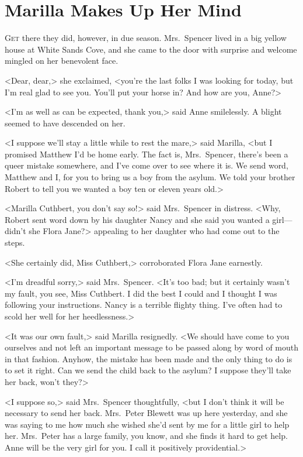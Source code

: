 \chapter{Marilla Makes Up Her Mind}

\lettrine[]{G}{et} there they did, however, in due season. Mrs.~Spencer lived in a big yellow house at White Sands Cove, and she came to the door with surprise and welcome mingled on her benevolent face.

\zz
<Dear, dear,> she exclaimed, <you're the last folks I was looking for today, but I'm real glad to see you. You'll put your horse in? And how are you, Anne?>

<I'm as well as can be expected, thank you,> said Anne smilelessly. A blight seemed to have descended on her.

<I suppose we'll stay a little while to rest the mare,> said Marilla, <but I promised Matthew I'd be home early. The fact is, Mrs.~Spencer, there's been a queer mistake somewhere, and I've come over to see where it is. We send word, Matthew and I, for you to bring us a boy from the asylum. We told your brother Robert to tell you we wanted a boy ten or eleven years old.>

<Marilla Cuthbert, you don't say so!> said Mrs.~Spencer in distress. <Why, Robert sent word down by his daughter Nancy and she said you wanted a girl—didn't she Flora Jane?> appealing to her daughter who had come out to the steps.

<She certainly did, Miss Cuthbert,> corroborated Flora Jane earnestly.

<I'm dreadful sorry,> said Mrs.~Spencer. <It's too bad; but it certainly wasn't my fault, you see, Miss Cuthbert. I did the best I could and I thought I was following your instructions. Nancy is a terrible flighty thing. I've often had to scold her well for her heedlessness.>

<It was our own fault,> said Marilla resignedly. <We should have come to you ourselves and not left an important message to be passed along by word of mouth in that fashion. Anyhow, the mistake has been made and the only thing to do is to set it right. Can we send the child back to the asylum? I suppose they'll take her back, won't they?>

<I suppose so,> said Mrs.~Spencer thoughtfully, <but I don't think it will be necessary to send her back. Mrs.~Peter Blewett was up here yesterday, and she was saying to me how much she wished she'd sent by me for a little girl to help her. Mrs.~Peter has a large family, you know, and she finds it hard to get help. Anne will be the very girl for you. I call it positively providential.>


